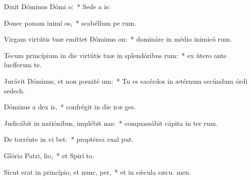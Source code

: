 \item Dixit Dóminus Dómi o:~* Sede a  is:
\item Donec ponam inimí os,~* scabéllum pe rum.
\item Virgam virtútis tuæ emíttet Dóminus  on:~* domináre in médio inimicó rum.
\item Tecum princípium in die virtútis tuæ in splendóribus rum:~* ex útero ante lucíferum  te.
\item Jurávit Dóminus, et non pœnité um:~* Tu es sacérdos in ætérnum secúndum órdi sedech.
\item Dóminus a dex is,~* confrégit in die iræ  ges.
\item Judicábit in natiónibus, implébit nas:~* conquassábit cápita in ter rum.
\item De torrénte in vi bet:~* proptérea exal put.
\item Glória Patri,  lio,~* et Spirí to.
\item Sicut erat in princípio, et nunc,  per,~* et in sǽcula sæcu. men.
